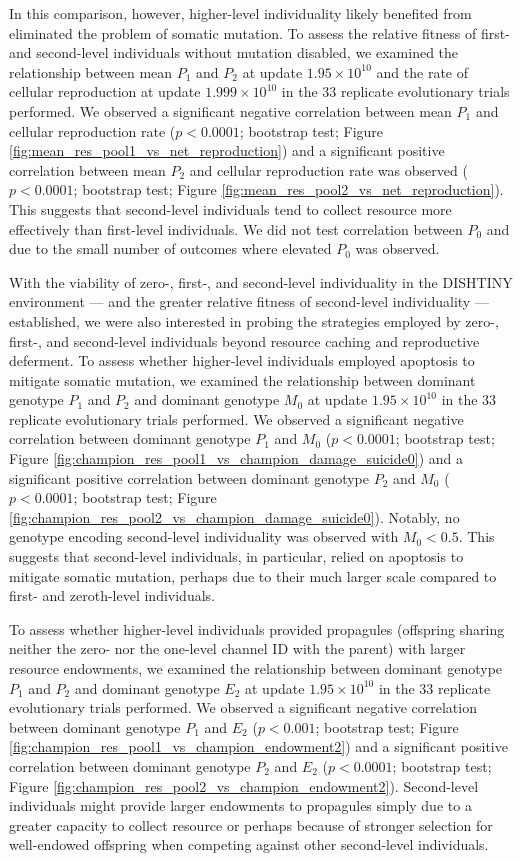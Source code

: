 In this comparison, however, higher-level individuality likely benefited from eliminated the problem of somatic mutation.
To assess the relative fitness of first- and second-level individuals without mutation disabled, we examined the relationship between mean $P_1$ and $P_2$ at update $1.95 \times 10^{10}$ and the rate of cellular reproduction at update $1.999 \times 10^{10}$ in the 33 replicate evolutionary trials performed.
We observed a significant negative correlation between mean $P_1$ and cellular reproduction rate ($p < 0.0001$; bootstrap test; Figure \ref{fig:mean_res_pool1_vs_net_reproduction}) and a significant positive correlation between mean $P_2$ and cellular reproduction rate was observed ($p < 0.0001$; bootstrap test; Figure \ref{fig:mean_res_pool2_vs_net_reproduction}).
This suggests that second-level individuals tend to collect resource more effectively than first-level individuals.
We did not test correlation between $P_0$ and due to the small number of outcomes where elevated $P_0$ was observed.

With the viability of zero-, first-, and second-level individuality in the DISHTINY environment --- and the greater relative fitness of second-level individuality --- established, we were also interested in probing the strategies employed by zero-, first-, and second-level individuals beyond resource caching and reproductive deferment.
To assess whether higher-level individuals employed apoptosis to mitigate somatic mutation, we examined the relationship between dominant genotype $P_1$ and $P_2$ and dominant genotype $M_0$ at update $1.95 \times 10^{10}$ in the 33 replicate evolutionary trials performed.
We observed a significant negative correlation between dominant genotype $P_1$ and $M_0$ ($p < 0.0001$; bootstrap test; Figure \ref{fig:champion_res_pool1_vs_champion_damage_suicide0}) and a significant positive correlation between dominant genotype $P_2$ and $M_0$ ($p < 0.0001$; bootstrap test; Figure \ref{fig:champion_res_pool2_vs_champion_damage_suicide0}).
Notably, no genotype encoding second-level individuality was observed with $M_0 < 0.5$.
This suggests that second-level individuals, in particular, relied on apoptosis to mitigate somatic mutation, perhaps due to their much larger scale compared to first- and zeroth-level individuals.

To assess whether higher-level individuals provided propagules (offspring sharing neither the zero- nor the one-level channel ID with the parent) with larger resource endowments, we examined the relationship between dominant genotype $P_1$ and $P_2$ and dominant genotype $E_2$ at update $1.95 \times 10^{10}$ in the 33 replicate evolutionary trials performed.
We observed a significant negative correlation between dominant genotype $P_1$ and $E_2$ ($p < 0.001$; bootstrap test; Figure \ref{fig:champion_res_pool1_vs_champion_endowment2}) and a significant positive correlation between dominant genotype $P_2$ and $E_2$ ($p <  0.0001$; bootstrap test; Figure \ref{fig:champion_res_pool2_vs_champion_endowment2}).
Second-level individuals might provide larger endowments to propagules simply due to a greater capacity to collect resource or perhaps because of stronger selection for well-endowed offspring when competing against other second-level individuals.
